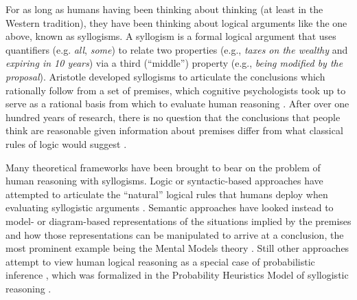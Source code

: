 \documentclass[floatsintext, doc]{apa6}
\begin{document}
For as long as humans having been thinking about thinking (at least in the Western tradition), they have been thinking about logical arguments like the one above, known as syllogisms.
A syllogism is a formal logical argument that uses quantifiers (e.g. \emph{all}, \emph{some}) to relate two properties (e.g., \emph{taxes on the wealthy} and \emph{expiring in 10 years}) via a third (``middle'') property (e.g., \emph{being modified by the proposal}). 
Aristotle developed syllogisms to articulate the conclusions which rationally follow from a set of premises, which cognitive psychologists took up to serve as a rational basis from which to evaluate human reasoning \cite{Storring1908}.
After over one hundred years of research, there is no question that the conclusions that people think are reasonable given  information about premises differ from what classical rules of logic would suggest \cite<for a meta-analysis, see:>{Khemlani2012}.


Many theoretical frameworks have been brought to bear on the problem of human reasoning with syllogisms.
Logic or syntactic-based approaches have attempted to articulate the ``natural'' logical rules that humans deploy when evaluating syllogistic arguments \cite{braine1983logical, rips1994, geurts2003reasoning}.
Semantic approaches have looked instead to model- or diagram-based representations of the situations implied by the premises and how those representations can be manipulated to arrive at a conclusion, the most prominent example being the Mental Models theory \cite{johnson1975models}.
Still other approaches attempt to view human logical reasoning as a special case of probabilistic inference \cite{oaksford2001probabilistic, oaksford2007bayesian, hahn2007rationality, tenenbaum2006theory}, which was formalized in the Probability Heuristics Model of syllogistic reasoning \cite{Chater1999}.
\end{document}
